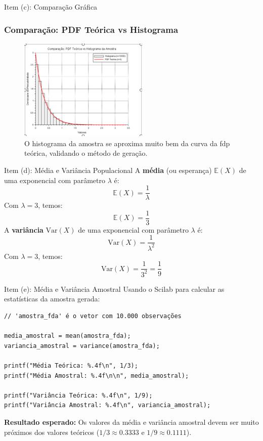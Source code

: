 \begin{frame}{Item (c): Comparação Gráfica}
\frametitle{Comparação: PDF Teórica vs Histograma}
\begin{figure}
    \centering
    \includegraphics[width=0.55\textwidth]{figures/comparacao.png}
    \caption{O histograma da amostra se aproxima muito bem da curva da fdp teórica, validando o método de geração.}
    \label{fig:comparacao}
\end{figure}
\end{frame}


\begin{frame}{Item (d): Média e Variância Populacional}
A \textbf{média} (ou esperança) $\mathbb{E}(X)$ de uma exponencial com parâmetro $\lambda$ é:
\[
\mathbb{E}(X) = \frac{1}{\lambda}
\]
Com $\lambda = 3$, temos:
\[
\mathbb{E}(X) = \boxed{\frac{1}{3}}
\]
\vspace{1cm}
A \textbf{variância} $\text{Var}(X)$ de uma exponencial com parâmetro $\lambda$ é:
\[
\text{Var}(X) = \frac{1}{\lambda^2}
\]
Com $\lambda = 3$, temos:
\[
\text{Var}(X) = \frac{1}{3^2} = \boxed{\frac{1}{9}}
\]
\end{frame}

\begin{frame}[fragile]{Item (e): Média e Variância Amostral}
Usando o Scilab para calcular as estatísticas da amostra gerada:
\begin{lstlisting}
// 'amostra_fda' é o vetor com 10.000 observações

media_amostral = mean(amostra_fda);
variancia_amostral = variance(amostra_fda);

printf("Média Teórica: %.4f\n", 1/3);
printf("Média Amostral: %.4f\n\n", media_amostral);

printf("Variância Teórica: %.4f\n", 1/9);
printf("Variância Amostral: %.4f\n", variancia_amostral);
\end{lstlisting}
\vspace{0.5cm}
\textbf{Resultado esperado:} Os valores da média e variância amostral devem ser muito próximos dos valores teóricos ($1/3 \approx 0.3333$ e $1/9 \approx 0.1111$).
\end{frame}